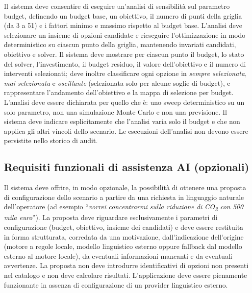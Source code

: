  \label{rf:sensibilita}
Il sistema deve consentire di eseguire un'analisi di sensibilità sul parametro budget, definendo un budget base, un obiettivo, il numero di punti della griglia (da 3 a 51) e i fattori minimo e massimo rispetto al budget base. L'analisi deve selezionare un insieme di opzioni candidate e rieseguire l'ottimizzazione in modo deterministico su ciascun punto della griglia, mantenendo invariati candidati, obiettivo e solver. Il sistema deve mostrare per ciascun punto il budget, lo stato del solver, l'investimento, il budget residuo, il valore dell'obiettivo e il numero di interventi selezionati; deve inoltre classificare ogni opzione in \emph{sempre selezionata}, \emph{mai selezionata} e \emph{oscillante} (selezionata solo per alcune soglie di budget), e rappresentare l'andamento dell'obiettivo e la mappa di selezione per budget. L'analisi deve essere dichiarata per quello che è: uno sweep deterministico su un solo parametro, non una simulazione Monte Carlo e non una previsione. Il sistema deve indicare esplicitamente che l'analisi varia solo il budget e che non applica gli altri vincoli dello scenario. Le esecuzioni dell'analisi non devono essere persistite nello storico di audit.

\subsection{Requisiti funzionali di assistenza AI (opzionali)}

 \label{rf:ai_proposta}
Il sistema deve offrire, in modo opzionale, la possibilità di ottenere una proposta di configurazione dello scenario a partire da una richiesta in linguaggio naturale dell'operatore (ad esempio ``\emph{vorrei concentrarmi sulla riduzione di CO\textsubscript{2} con 500 mila euro}''). La proposta deve riguardare esclusivamente i parametri di configurazione (budget, obiettivo, insieme dei candidati) e deve essere restituita in forma strutturata, corredata da una motivazione, dall'indicazione dell'origine (motore a regole locale, modello linguistico esterno oppure fallback dal modello esterno al motore locale), da eventuali informazioni mancanti e da eventuali avvertenze. La proposta non deve introdurre identificativi di opzioni non presenti nel catalogo e non deve calcolare risultati. L'applicazione deve essere pienamente funzionante in assenza di configurazione di un provider linguistico esterno.

